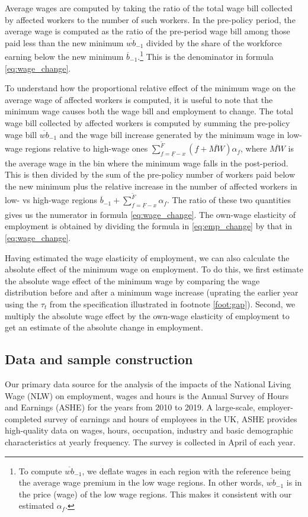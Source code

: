 Average wages are computed by taking the ratio of the total wage bill collected by affected workers to the number of such workers. In the pre-policy period, the average wage is computed as the ratio of the pre-period wage bill among those paid less than the new minimum $\overline{wb}_{-1}$ divided by the share of the workforce earning below the new minimum $\overline{b}_{-1}$.\footnote{To compute $\overline{wb}_{-1}$, we deflate wages in each region with the reference being the average wage premium in the low wage regions. In other words, $\overline{wb}_{-1}$ is in the price (wage) of the low wage regions. This makes it consistent with our estimated $\alpha_{f}$.} This is the denominator in formula \ref{eq:wage_change}.

To understand how the proportional relative effect of the minimum wage on the average wage of affected workers is computed, it is useful to note that the minimum wage causes both the wage bill and employment to change. The total wage bill collected by affected workers is computed by summing the pre-policy wage bill $\overline{wb}_{-1}$ and the wage bill increase generated by the minimum wage in low-wage regions relative to high-wage ones $\sum_{f=\underline{F}-x}^{\tilde{F}}\left(f + \overline{MW}\right)\alpha_{f}$, where $\overline{MW}$ is the average wage in the bin where the minimum wage falls in the post-period. This is then divided by the sum of the pre-policy number of workers paid below the new minimum plus the relative increase in the number of affected workers in low- vs high-wage regions $\overline{b}_{-1} + \sum_{f=\underline{F}-x}^{\tilde{F}}\alpha_{f}$. The ratio of these two quantities gives us the numerator in formula \ref{eq:wage_change}. The own-wage elasticity of employment is obtained by dividing the formula in \ref{eq:emp_change} by that in \ref{eq:wage_change}.

Having estimated the wage elasticity of employment, we can also calculate the absolute effect of the minimum wage on employment. To do this, we first estimate the absolute wage effect of the minimum wage by comparing the wage distribution before and after a minimum wage increase (uprating the earlier year using the $\tau_{t}$ from the specification illustrated in footnote \ref{foot:gap}). Second, we multiply the absolute wage effect by the own-wage elasticity of employment to get an estimate of the absolute change in employment. 


\subsection{Data and sample construction}  \label{sec:lm_data}
Our primary data source for the analysis of the impacts of the National Living Wage (NLW) on employment, wages and hours is the Annual Survey of Hours and Earnings (ASHE) for the years from 2010 to 2019. A large-scale, employer-completed survey of earnings and hours of employees in the UK, ASHE provides high-quality data on wages, hours, occupation, industry and basic demographic characteristics at yearly frequency. The survey is collected in April of each year. 

